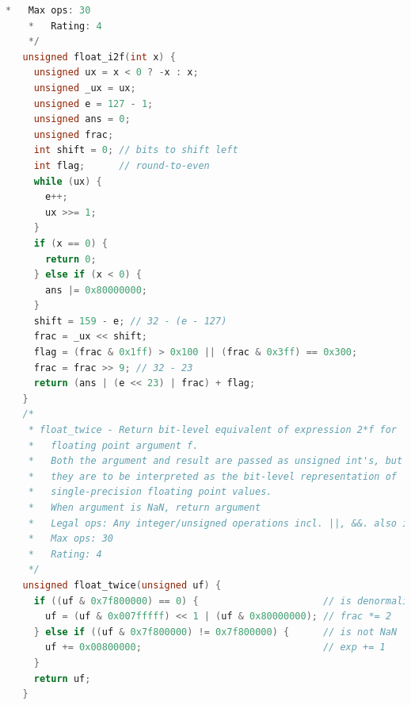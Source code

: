 \documentclass{article}
\begin{document}
\begin{lstlisting}[language=C]
    *   Max ops: 30
    *   Rating: 4
    */
   unsigned float_i2f(int x) {
     unsigned ux = x < 0 ? -x : x;
     unsigned _ux = ux;
     unsigned e = 127 - 1;
     unsigned ans = 0;
     unsigned frac;
     int shift = 0; // bits to shift left
     int flag;      // round-to-even
     while (ux) {
       e++;
       ux >>= 1;
     }
     if (x == 0) {
       return 0;
     } else if (x < 0) {
       ans |= 0x80000000;
     }
     shift = 159 - e; // 32 - (e - 127)
     frac = _ux << shift;
     flag = (frac & 0x1ff) > 0x100 || (frac & 0x3ff) == 0x300;
     frac = frac >> 9; // 32 - 23
     return (ans | (e << 23) | frac) + flag;
   }
   /* 
    * float_twice - Return bit-level equivalent of expression 2*f for
    *   floating point argument f.
    *   Both the argument and result are passed as unsigned int's, but
    *   they are to be interpreted as the bit-level representation of
    *   single-precision floating point values.
    *   When argument is NaN, return argument
    *   Legal ops: Any integer/unsigned operations incl. ||, &&. also if, while
    *   Max ops: 30
    *   Rating: 4
    */
   unsigned float_twice(unsigned uf) {
     if ((uf & 0x7f800000) == 0) {                      // is denormalized
       uf = (uf & 0x007fffff) << 1 | (uf & 0x80000000); // frac *= 2
     } else if ((uf & 0x7f800000) != 0x7f800000) {      // is not NaN
       uf += 0x00800000;                                // exp += 1
     }
     return uf;
   }
   
\end{lstlisting} 
\normalsize
\end{document}
